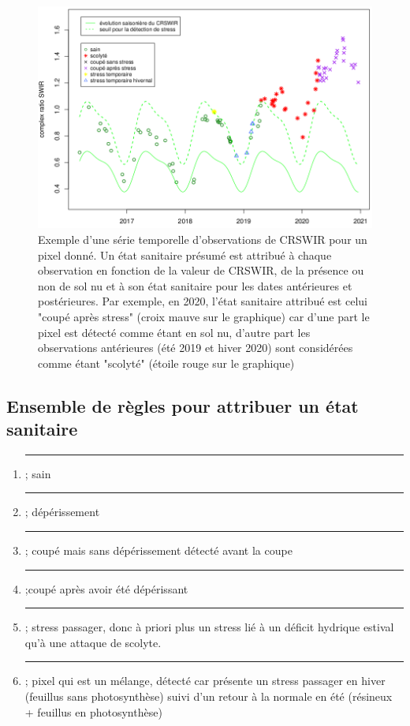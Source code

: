 \documentclass[a4paper, 12pt]{article} %
\newcommand\crule[3][black]{\textcolor{#1}{\rule{#2}{#3}}}
\begin{document}
\begin{figure}[H]
	\centering
	\includegraphics[width=0.9\linewidth]{illuArbreCoupe.png}
	\caption{Exemple d'une série temporelle d'observations de CRSWIR pour un pixel donné. Un état sanitaire présumé est attribué à chaque observation en fonction de la valeur de CRSWIR, de la présence ou non de sol nu et à son état sanitaire pour les dates antérieures et postérieures. Par exemple, en 2020, l'état sanitaire attribué est celui "coupé après stress" (croix mauve sur le graphique) car d'une part le pixel est détecté comme étant en sol nu, d'autre part les observations antérieures (été 2019 et hiver 2020) sont considérées comme étant "scolyté" (étoile rouge sur le graphique) }
	\label{fig:ex}
\end{figure}

\subsection{Ensemble de règles pour attribuer un état sanitaire}

\begin{enumerate}

	\item \crule[cl1]{1cm}{1cm} ; sain 

	\item \crule[cl2]{1cm}{1cm} ; dépérissement 

	\item \crule[cl3]{1cm}{1cm} ; coupé mais sans dépérissement détecté avant la coupe 

	\item  \crule[cl4]{1cm}{1cm} ;coupé après avoir été dépérissant
	\item \crule[cl5]{1cm}{1cm} ; stress passager, donc à priori plus un stress lié à un déficit hydrique estival qu'à une attaque de scolyte. 
	\item \crule[cl6]{1cm}{1cm} ; pixel qui est un mélange, détecté car présente un stress passager en hiver (feuillus sans photosynthèse) suivi d'un retour à la normale en été (résineux + feuillus en photosynthèse) 
\end{enumerate}
\end{document}
